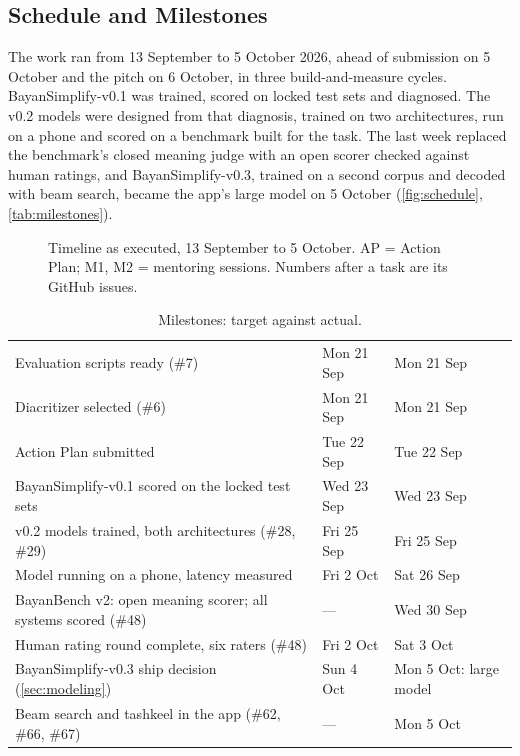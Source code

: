 \documentclass[10pt,a4paper]{article}
\newcommand{\vOne}{BayanSimplify-v0.1}
\newcommand{\vThree}{BayanSimplify-v0.3}
\begin{document}
\subsection{Schedule and Milestones}

The work ran from 13 September to 5 October 2026, ahead of submission on
5 October and the pitch on 6 October, in three build-and-measure cycles. \vOne{}
was trained, scored on locked test sets and diagnosed. The v0.2 models were
designed from that diagnosis, trained on two architectures, run on a phone and
scored on a benchmark built for the task. The last week replaced the benchmark's
closed meaning judge with an open scorer checked against human ratings, and
\vThree{}, trained on a second corpus and decoded with beam search, became the
app's large model on 5 October (\autoref{fig:schedule}, \autoref{tab:milestones}).

\begin{figure}[p]
\centering
\resizebox{0.62\linewidth}{!}{\figschedule}
\caption{Timeline as executed, 13 September to 5 October. AP = Action Plan; M1,
M2 = mentoring sessions. Numbers after a task are its GitHub issues.}
\label{fig:schedule}
\end{figure}

\begin{table}[p]
\small
\caption{Milestones: target against actual.}
\label{tab:milestones}
\begin{tabularx}{\linewidth}{|L|C{21mm}|C{21mm}|}
\hline
{} &  &  \\ \hline
Evaluation scripts ready (\#7)                        & Mon 21 Sep & Mon 21 Sep \\ \hline
Diacritizer selected (\#6)                            & Mon 21 Sep & Mon 21 Sep \\ \hline
Action Plan submitted                                 & Tue 22 Sep & Tue 22 Sep \\ \hline
\vOne{} scored on the locked test sets                & Wed 23 Sep & Wed 23 Sep \\ \hline
v0.2 models trained, both architectures (\#28, \#29)  & Fri 25 Sep & Fri 25 Sep \\ \hline
Model running on a phone, latency measured            & Fri 2 Oct  & Sat 26 Sep \\ \hline
BayanBench v2: open meaning scorer; all systems scored (\#48) & ---  & Wed 30 Sep \\ \hline
Human rating round complete, six raters (\#48)        & Fri 2 Oct  & Sat 3 Oct \\ \hline
\vThree{} ship decision (\autoref{sec:modeling})           & Sun 4 Oct  & Mon 5 Oct: large model \\ \hline
Beam search and tashkeel in the app (\#62, \#66, \#67) & --- & Mon 5 Oct \\ \hline
\end{tabularx}
\end{table}
\end{document}
